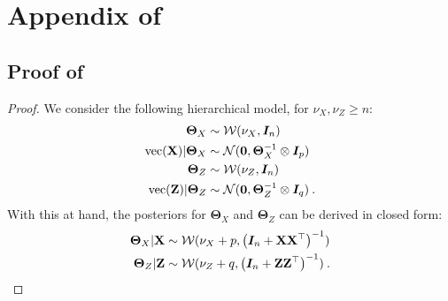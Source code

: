 
\chapter{Appendix of }

\minitoc

\section{Proof of }

\PCAgraphcoupling*

\begin{proof}
We consider the following hierarchical model, for $\nu_{X}, \nu_{Z} \geq n$:
\begin{align*}
    \bm{\Theta}_{X} &\sim  \mathcal{W}(\nu_{X}, \bm{I}_n) \\
    \mathrm{vec}(\mathbf{X}) | \bm{\Theta}_{X} &\sim \mathcal{N}(\bm{0}, \bm{\Theta}_{X}^{-1} \otimes \bm{I}_p) \\
    \bm{\Theta}_{Z} &\sim  \mathcal{W}(\nu_{Z}, \bm{I}_n) \\
    \mathrm{vec}(\mathbf{Z}) | \bm{\Theta}_{Z} &\sim \mathcal{N}(\bm{0}, \bm{\Theta}_{Z}^{-1} \otimes \bm{I}_q) \:.
\end{align*}
With this at hand, the posteriors for $\bm{\Theta}_X$ and $\bm{\Theta}_Z$ can be derived in closed form: 
\begin{align*}
    \bm{\Theta}_{X} | \mathbf{X} &\sim  \mathcal{W}(\nu_{X}+p, \left(\bm{I}_n + \mathbf{X} \mathbf{X}^\top\right)^{-1}) \\
    \bm{\Theta}_{Z} | \mathbf{Z} &\sim  \mathcal{W}(\nu_{Z} + q, \left(\bm{I}_n + \mathbf{Z} \mathbf{Z}^\top\right)^{-1}) \:.
\end{align*}


\end{proof}
